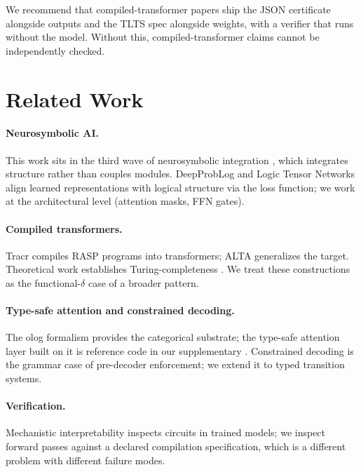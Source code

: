 \documentclass[preprint]{nesy2026}
\begin{document}
We recommend that compiled-transformer papers ship the JSON
certificate alongside outputs and the TLTS spec alongside weights,
with a verifier that runs without the model. Without this,
compiled-transformer claims cannot be independently checked.

\section{Related Work}
\label{sec:related}

\paragraph{Neurosymbolic AI.} This work sits in the third wave of
neurosymbolic integration \citep{garcez2023nesy3rd, deraedt2020nesy},
which integrates structure rather than couples modules. DeepProbLog \citep{manhaeve2018deepproblog} and Logic
Tensor Networks \citep{badreddine2022ltn} align learned
representations with logical structure via the loss function; we
work at the architectural level (attention masks, FFN gates).

\paragraph{Compiled transformers.} Tracr \citep{lindner2023tracr}
compiles RASP programs into transformers; ALTA generalizes the
target. Theoretical work establishes Turing-completeness
\citep{perez2021turing, bhattamishra2020computational}. We treat
these constructions as the functional-$\delta$ case of a broader
pattern.

\paragraph{Type-safe attention and constrained decoding.} The olog
formalism \citep{spivakkent2012ologs,spivak2014category} provides
the categorical substrate; the type-safe attention layer built on
it is reference code in our supplementary
\citep{constrained_decoding}. Constrained decoding
\citep{willard2023outlines, geng2023grammar} is the grammar case
of pre-decoder enforcement; we extend it to typed transition systems.

\paragraph{Verification.} Mechanistic interpretability
\citep{conmy2023acdc} inspects circuits in trained models; we
inspect forward passes against a declared compilation specification,
which is a different problem with different failure modes.
\end{document}
